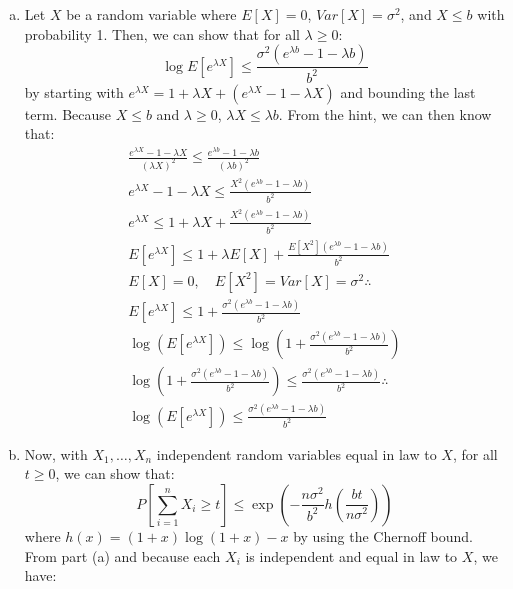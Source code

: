\documentclass[11pt,a4paper,margin=1in]{article}
\begin{document}
\section{}
\begin{enumerate}[(a)]
    \item Let $X$ be a random variable where $E[X] = 0$, $Var[X] = \sigma^2$, and
    $X \leq b$ with probability 1. Then, we can show that for all $\lambda \geq 0$:
    \[
        \log E[e^{\lambda X}] \leq \frac{\sigma^2(e^{\lambda b} - 1 - \lambda b)}{b^2}
    \]
    by starting with $e^{\lambda X} = 1 + \lambda X + (e^{\lambda X} - 1 - \lambda X)$
    and bounding the last term. Because $X \leq b$ and $\lambda \geq 0$, $\lambda X \leq \lambda b$.
    From the hint, we can then know that:
    \begin{gather*}
        \frac{e^{\lambda X} - 1 - \lambda X}{(\lambda X)^2} \leq \frac{e^{\lambda b} - 1 - \lambda b}{(\lambda b)^2} \\
        e^{\lambda X} - 1 - \lambda X \leq \frac{X^2(e^{\lambda b} - 1 - \lambda b)}{b^2} \\
        e^{\lambda X} \leq 1 + \lambda X + \frac{X^2(e^{\lambda b} - 1 - \lambda b)}{b^2} \\
        E[e^{\lambda X}] \leq 1 + \lambda E[X] + \frac{E[X^2](e^{\lambda b} - 1 - \lambda b)}{b^2} \\
        E[X] = 0, \quad E[X^2] = Var[X] = \sigma^2 \therefore \\
        E[e^{\lambda X}] \leq 1 + \frac{\sigma^2(e^{\lambda b} - 1 - \lambda b)}{b^2} \\
        \log(E[e^{\lambda X}]) \leq \log\left(1 + \frac{\sigma^2(e^{\lambda b} - 1 - \lambda b)}{b^2}\right) \\
        \log\left(1 + \frac{\sigma^2(e^{\lambda b} - 1 - \lambda b)}{b^2}\right) \leq \frac{\sigma^2(e^{\lambda b} - 1 - \lambda b)}{b^2} \therefore \\
        \log(E[e^{\lambda X}]) \leq \frac{\sigma^2(e^{\lambda b} - 1 - \lambda b)}{b^2}
    \end{gather*}
    \item Now, with $X_1, \dots, X_n$ independent random variables equal in law
    to $X$, for all $t \geq 0$, we can show that:
    \[
        P\left[\sum_{i=1}^n X_i \geq t\right] \leq \exp\left(-\frac{n\sigma^2}{b^2} h\left(\frac{bt}{n\sigma^2}\right)\right)
    \]
    where $h(x) = (1+x)\log(1+x) - x$ by using the Chernoff bound. From part (a)
    and because each $X_i$ is independent and equal in law to $X$, we have:
    \begin{gather*}

\end{gather*}
\end{enumerate}
\end{document}
